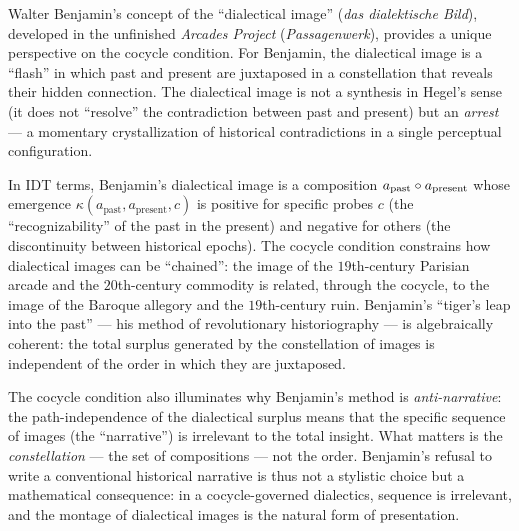 \begin{interpretation}
\label{interp:ch16:benjamin_dialectical_image}
Walter Benjamin's concept of the ``dialectical image'' (\textit{das
dialektische Bild}), developed in the unfinished \textit{Arcades Project}
(\textit{Passagenwerk}), provides a unique perspective on the cocycle
condition.  For Benjamin, the dialectical image is a ``flash'' in which
past and present are juxtaposed in a constellation that reveals their
hidden connection.  The dialectical image is not a synthesis in Hegel's
sense (it does not ``resolve'' the contradiction between past and present)
but an \emph{arrest} --- a momentary crystallization of historical
contradictions in a single perceptual configuration.

In IDT terms, Benjamin's dialectical image is a composition $a_{\text{past}}
\circ a_{\text{present}}$ whose emergence $\kappa(a_{\text{past}},
a_{\text{present}}, c)$ is positive for specific probes $c$ (the
``recognizability'' of the past in the present) and negative for others
(the discontinuity between historical epochs).  The cocycle condition
constrains how dialectical images can be ``chained'': the image of
the $19$th-century Parisian arcade and the $20$th-century commodity is
related, through the cocycle, to the image of the Baroque allegory and the
$19$th-century ruin.  Benjamin's ``tiger's leap into the past'' --- his
method of revolutionary historiography --- is algebraically coherent:
the total surplus generated by the constellation of images is independent
of the order in which they are juxtaposed.

The cocycle condition also illuminates why Benjamin's method is
\emph{anti-narrative}: the path-independence of the dialectical surplus
means that the specific sequence of images (the ``narrative'') is
irrelevant to the total insight.  What matters is the \emph{constellation}
--- the set of compositions --- not the order.  Benjamin's refusal to
write a conventional historical narrative is thus not a stylistic choice
but a mathematical consequence: in a cocycle-governed dialectics, sequence
is irrelevant, and the montage of dialectical images is the natural form
of presentation.
\end{interpretation}

